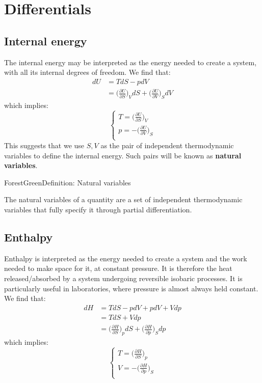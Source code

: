 \documentclass[a4paper,11pt,oneside]{book}
\begin{document}
\section{Differentials}
\subsection*{Internal energy}
The internal energy may be interpreted as the energy needed to create a system, with all its internal degrees of freedom. 
We find that:
\begin{align}
    dU &= TdS-pdV\\
    &= \bigg(\frac{\partial U}{\partial S}\bigg)_V dS + \bigg(\frac{\partial U}{\partial V}\bigg)_S dV  
\end{align}
which implies:
\begin{equation}
    \begin{cases}
    T = \big(\frac{\partial U}{\partial S}\big)_V \\
    p = -\big(\frac{\partial U}{\partial V}\big)_S\\
\end{cases}
\end{equation}
This suggests that we use $S,V$ as the pair of independent thermodynamic variables to define the internal energy. Such pairs will be known as \textbf{natural variables}.
\begin{mybox}{ForestGreen}{Definition: Natural variables}

The natural variables of a quantity are a set of independent thermodynamic variables that fully specify it through partial differentiation. 
\end{mybox}


\subsection*{Enthalpy}
Enthalpy is interpreted as the energy needed to create a system and the work needed to make space for it, at constant pressure. It is therefore the heat released/absorbed by a system undergoing reversible isobaric processes. It is particularly useful in laboratories, where pressure is almost always held constant. 
We find that:
\begin{align}
    dH &= TdS - pdV + pdV +  Vdp \\
    &= TdS + Vdp\\
    &= \bigg(\frac{\partial H}{\partial S}\bigg)_p dS + \bigg(\frac{\partial H}{\partial p}\bigg)_S dp  
\end{align}
which implies:
\begin{equation}
    \begin{cases}
    T = \big(\frac{\partial H}{\partial S}\big)_p \\
    V = -\big(\frac{\partial H}{\partial p}\big)_S\\
\end{cases}
\end{equation}
\end{document}
